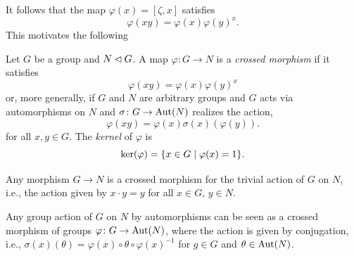 It follows that the map $\varphi(x)=[\zeta,x]$ satisfies
$$
    \varphi(xy) = \varphi(x)\varphi(y)^x.
$$
This motivates the following

\begin{defn}\label{def:crossed-morphism}
    Let\/ $G$ be a group and\/ $N\lhd G$. A map\/ $\varphi\colon G\to N$ is a \textsl{crossed morphism} if it satisfies
    $$
        \varphi(xy)=\varphi(x)\varphi(y)^x
    $$
    or, more generally, if\/ $G$ and\/ $N$ are arbitrary groups and\/ $G$ acts via automorphisms on\/ $N$ and $\sigma\colon G\to{\rm Aut}(N)$ realizes the action,
    $$
        \varphi(xy)=\varphi(x)\sigma(x)(\varphi(y)).
    $$
    for all\/ $x,y\in G$.
    The \textsl{kernel} of\/ $\varphi$ is
    $$
        \ker(\varphi)=\{x\in G\mid\varphi(x)=1\}.
    $$
\end{defn}

\begin{rem}
    Any morphism\/ $G\to N$ is a crossed morphism for the trivial action of\/ $G$ on\/ $N$, i.e., the action given by\/ $x\cdot y=y$ for all\/ $x\in G$, $y\in N$.
\end{rem}

\begin{prop}
    Any group action of\/ $G$ on\/ $N$ by automorphisms can be seen as a crossed morphism of groups\/ $\varphi\colon G\to{\rm Aut}(N)$, where the action is given by conjugation, i.e., $\sigma(x)(\theta)=\varphi(x)\circ\theta\circ\varphi(x)^{-1}$ for\/ $g\in G$ and\/ $\theta\in{\rm Aut}(N)$.
\end{prop}


